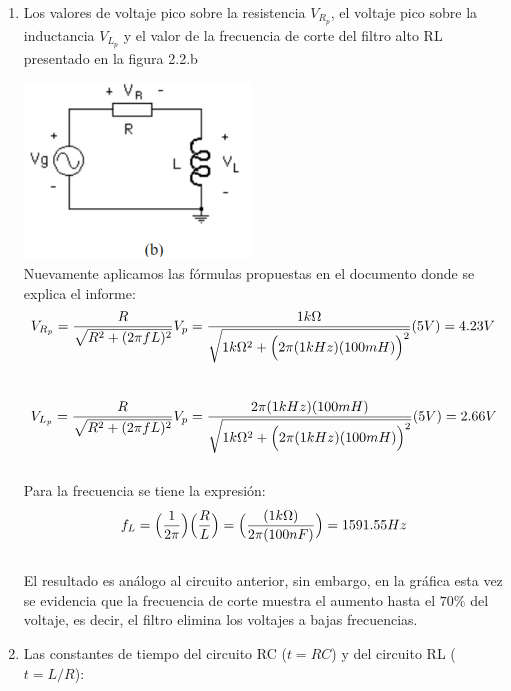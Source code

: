 \documentclass[12pt]{article}
\begin{document}
\begin{enumerate}
		\item Los valores de voltaje pico sobre la resistencia $V_{R_p}$, el voltaje pico sobre la inductancia $V_{L_p}$ y el valor de la frecuencia de corte del filtro alto RL presentado en la figura 2.2.b
		
		\includegraphics{Img/2_2_b}\\
		
		\noindent Nuevamente aplicamos las fórmulas propuestas en el documento donde se explica el informe:\\
		
		\begin{equation}
			\notag V_{R_p} = \frac{R}{\sqrt{R^2 + (2\pi f L)^2}}V_p = \frac{1k\Omega}{\sqrt{1k\Omega ^2 + \Big (2\pi (1kHz) (100mH)\Big)^2}}(5V) = 4.23V
		\end{equation}\\
	
		\begin{equation}
			\notag V_{L_p} = \frac{R}{\sqrt{R^2 + (2\pi f L)^2}}V_p = \frac{2\pi (1kHz) (100mH)}{\sqrt{1k\Omega ^2 + \Big (2\pi (1kHz) (100mH)\Big)^2}}(5V) = 2.66V
		\end{equation}\\
	
		\noindent Para la frecuencia se tiene la expresión:\\
		
		\begin{equation}
			\notag f_L = \Big(\frac{1}{2\pi}\Big)\Big(\frac{R}{L}\Big) = \Big(\frac{(1k\Omega)}{2\pi (100nF)}\Big) = 1591.55Hz
		\end{equation}\\
	
		\noindent El resultado es análogo al circuito anterior, sin embargo, en la gráfica esta vez se evidencia que la frecuencia de corte muestra el aumento hasta el $70\%$ del voltaje, es decir, el filtro elimina los voltajes a bajas frecuencias.\\
		
		\item Las constantes de tiempo del circuito RC ($t = RC$) y del circuito RL ($t = L/R$):\\
		

\end{enumerate}
\end{document}
